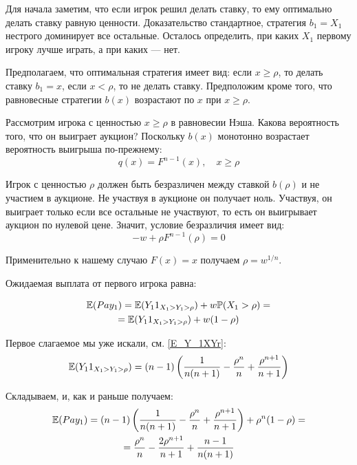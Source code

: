\begin{enumerate}
Для начала заметим, что если игрок решил делать ставку, то ему оптимально делать ставку равную ценности. Доказательство стандартное, стратегия $ b_{1}=X_{1} $ нестрого доминирует все остальные. Осталось определить, при каких $ X_{1} $ первому игроку лучше играть, а при каких  — нет.

Предполагаем, что оптимальная стратегия имеет вид: если $ x\geq \rho $, то делать ставку $ b_{1}=x $, если $ x<\rho $, то не делать ставку. Предположим кроме того, что равновесные стратегии $ b(x) $ возрастают по $ x $ при $ x\geq \rho $.

Рассмотрим игрока с ценностью $ x\geq \rho $ в равновесии Нэша. Какова вероятность того, что он выиграет аукцион? Поскольку $ b(x) $ монотонно возрастает вероятность выигрыша по-прежнему:
\begin{equation}
q(x)=F^{n-1}(x),\quad x\geq \rho
\end{equation}

Игрок с ценностью $ \rho $ должен быть безразличен между ставкой $ b(\rho) $ и не участием в аукционе. Не участвуя в аукционе он получает ноль. Участвуя, он выиграет только если все остальные не участвуют, то есть он выигрывает аукцион по нулевой цене. Значит, условие безразличия имеет вид:
\begin{equation}
-w+\rho F^{n-1}(\rho)=0
\end{equation}

Применительно к нашему случаю $ F(x)=x $ получаем $ \rho=w^{1/n} $.


Ожидаемая выплата от первого игрока равна:

\begin{multline}
\mathbb{E}(Pay_{1})=\mathbb{E}(Y_{1}1_{X_{1}>Y_{1}>\rho})+w\mathbb{P}(X_{1}>\rho)=\\
=\mathbb{E}(Y_{1}1_{X_{1}>Y_{1}>\rho})+w(1-\rho)
\end{multline}

Первое слагаемое мы уже искали, см. \ref{E_Y_1XYr}:
\begin{equation}
\mathbb{E}(Y_{1}1_{X_{1}>Y_{1}>\rho})=(n-1)\left(\frac{1}{n(n+1)}-\frac{\rho^{n}}{n}+\frac{\rho^{n+1}}{n+1}\right)
\end{equation}

Складываем, и, как и раньше получаем:
\begin{multline}
\mathbb{E}(Pay_{1})=(n-1)\left(\frac{1}{n(n+1)}-\frac{\rho^{n}}{n}+\frac{\rho^{n+1}}{n+1}\right)+\rho^{n}(1-\rho)=\\
=\frac{\rho^{n}}{n}-\frac{2\rho^{n+1}}{n+1}+\frac{n-1}{n(n+1)}
\end{multline}


\end{enumerate}
